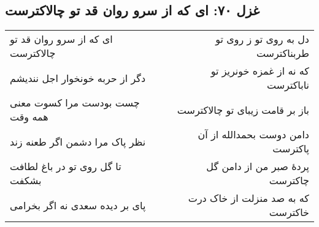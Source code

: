 \begin{center}
\section*{غزل ۷۰: ای که از سرو روان قد تو چالاکترست}
\label{sec:070}
\begin{longtable}{l p{0.5cm} r}
ای که از سرو روان قد تو چالاکترست
&&
دل به روی تو ز روی تو طربناکترست
\\
دگر از حربه خونخوار اجل نندیشم
&&
که نه از غمزه خونریز تو ناباکترست
\\
چست بودست مرا کسوت معنی همه وقت
&&
باز بر قامت زیبای تو چالاکترست
\\
نظر پاک مرا دشمن اگر طعنه زند
&&
دامن دوست بحمدالله از آن پاکترست
\\
تا گل روی تو در باغ لطافت بشکفت
&&
پردهٔ صبر من از دامن گل چاکترست
\\
پای بر دیده سعدی نه اگر بخرامی
&&
که به صد منزلت از خاک درت خاکترست
\\
\end{longtable}
\end{center}
